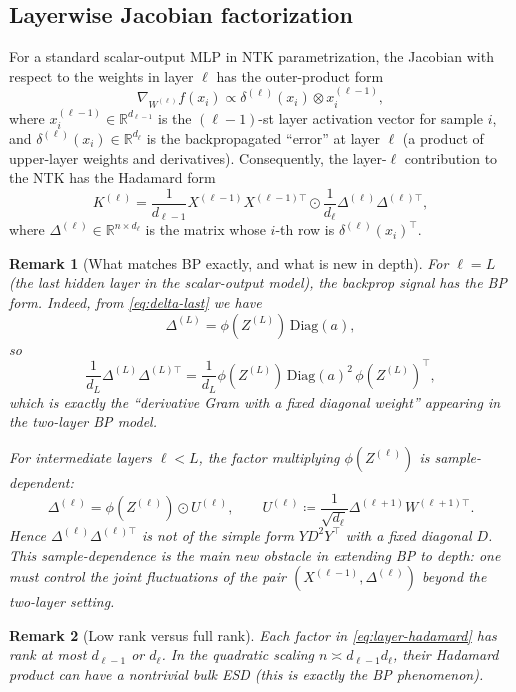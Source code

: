 \documentclass[11pt]{article}
\newcommand{\RR}{\mathbb{R}}
\newtheorem{remark}{Remark}
\begin{document}
\subsection{Layerwise Jacobian factorization}
For a standard scalar-output MLP in NTK parametrization, the Jacobian with respect to the weights in layer $\ell$ has the outer-product form
\[
  \nabla_{W^{(\ell)}} f(x_i)
  \propto
  \delta^{(\ell)}(x_i)\otimes x_i^{(\ell-1)},
\]
where $x_i^{(\ell-1)}\in\RR^{d_{\ell-1}}$ is the $(\ell-1)$-st layer activation vector for sample $i$, and $\delta^{(\ell)}(x_i)\in\RR^{d_\ell}$ is the backpropagated ``error'' at layer $\ell$ (a product of upper-layer weights and derivatives).
Consequently, the layer-$\ell$ contribution to the NTK has the Hadamard form
\begin{equation}\label{eq:layer-hadamard}
  K^{(\ell)}
  =
  \frac{1}{d_{\ell-1}}X^{(\ell-1)}X^{(\ell-1)\top}
  \odot
  \frac{1}{d_{\ell}} \Delta^{(\ell)}\Delta^{(\ell)\top},
\end{equation}
where $\Delta^{(\ell)}\in\RR^{n\times d_\ell}$ is the matrix whose $i$-th row is $\delta^{(\ell)}(x_i)^\top$.

\begin{remark}[What matches BP exactly, and what is new in depth]
For $\ell=L$ (the last hidden layer in the scalar-output model), the backprop signal has the \emph{BP form}.
Indeed, from \eqref{eq:delta-last} we have
\[
  \Delta^{(L)}=\phi(Z^{(L)})\,\mathrm{Diag}(a),
\]
so
\[
  \frac{1}{d_L}\Delta^{(L)}\Delta^{(L)\top}
  =
  \frac{1}{d_L}\phi(Z^{(L)})\,\mathrm{Diag}(a)^2\,\phi(Z^{(L)})^\top,
\]
which is exactly the ``derivative Gram with a fixed diagonal weight'' appearing in the two-layer BP model.

For intermediate layers $\ell<L$, the factor multiplying $\phi(Z^{(\ell)})$ is \emph{sample-dependent}:
\[
  \Delta^{(\ell)} = \phi(Z^{(\ell)})\odot U^{(\ell)},\qquad
  U^{(\ell)}\coloneqq \frac{1}{\sqrt{d_\ell}}\Delta^{(\ell+1)}W^{(\ell+1)\top}.
\]
Hence $\Delta^{(\ell)}\Delta^{(\ell)\top}$ is not of the simple form $Y D^2 Y^\top$ with a fixed diagonal $D$.
This sample-dependence is the main new obstacle in extending BP to depth: one must control the joint fluctuations of the pair $(X^{(\ell-1)},\Delta^{(\ell)})$ beyond the two-layer setting.
\end{remark}

\begin{remark}[Low rank versus full rank]
Each factor in \eqref{eq:layer-hadamard} has rank at most $d_{\ell-1}$ or $d_\ell$.
In the quadratic scaling $n\asymp d_{\ell-1}d_\ell$, their Hadamard product can have a nontrivial bulk ESD (this is exactly the BP phenomenon).
\end{remark}
\end{document}
